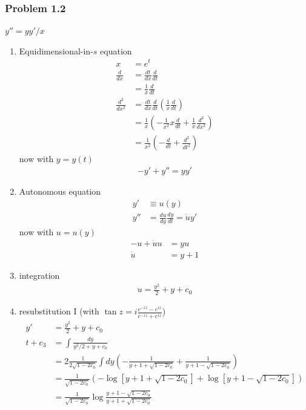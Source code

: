 \documentclass[10pt,a4paper]{book}
\theoremstyle{definition}
\begin{document}
\subsubsection{Problem 1.2}
$y''=yy'/x$
\begin{enumerate}
    \item Equidimensional-in-$s$ equation
    \begin{align}
        x&=e^t\\
        \frac{d}{dx}&=\frac{dt}{dx}\frac{d}{dt}\\
        &=\frac{1}{x}\frac{d}{dt}\\
        \frac{d^2}{dx^2}&=\frac{dt}{dx}\frac{d}{dt}\left(\frac{1}{x}\frac{d}{dt}\right)\\
        &=\frac{1}{x}\left(-\frac{1}{x^2}x\frac{d}{dt}+\frac{1}{x}\frac{d^2}{dx^2}\right)\\
        &=\frac{1}{x^2}\left(-\frac{d}{dt}+\frac{d^2}{dt^2}\right)
    \end{align}
    now with $y=y(t)$
    \begin{align}
        -y'+y''=yy'
    \end{align}
    \item Autonomous equation
    \begin{align}
        y'&\equiv u(y)\\
        y''&=\frac{du}{dy}\frac{dy}{dt}=\dot u y'
    \end{align}
    now with $u=u(y)$
    \begin{align}
        -u+\dot u u&=y u\\
        \dot u&=y+1
    \end{align}
    \item integration
    \begin{align}
        u=\frac{y^2}{2}+y+c_0
    \end{align}
    \item resubstitution I (with $\tan z = i\frac{e^{-iz}-e^{iz}}{e^{-iz}+e^{iz}}$)
    \begin{align}
        y'&=\frac{y^2}{2}+y+c_0\\
        t+c_3&=\int\frac{dy}{y^2/2+y+c_0}\\
        &=2\frac{1}{2\sqrt{1-2c_0}}\int dy\left(-\frac{1}{y+1+\sqrt{1-2c_0}}+\frac{1}{y+1-\sqrt{1-2c_0}}\right)\\
        &=\frac{1}{\sqrt{1-2c_0}}\left(-\log\left[y+1+\sqrt{1-2c_0}\right]+\log\left[y+1-\sqrt{1-2c_0}\right]\right)\\
        &=\frac{1}{\sqrt{1-2c_0}}\log\frac{y+1-\sqrt{1-2c_0}}{y+1+\sqrt{1-2c_0}}\\

\end{align}
\end{enumerate}
\end{document}
